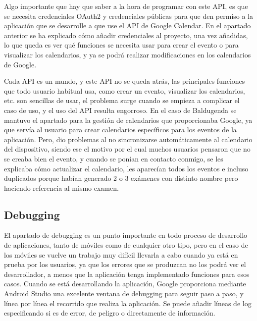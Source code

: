 Algo importante que hay que saber a la hora de programar con este API, es que se necesita credenciales OAuth2 y credenciales públicas para que den permiso a la aplicación que se desarrolle a que use el API de Google Calendar.
En el apartado anterior se ha explicado cómo añadir credenciales al proyecto, una vez añadidas, lo que queda es ver qué funciones se necesita usar para crear el evento o para visualizar los calendarios, y ya se podrá realizar modificaciones en los calendarios de Google.

Cada API es un mundo, y este API no se queda atrás, las principales funciones que todo usuario habitual usa, como crear un evento, visualizar los calendarios, etc. son sencillas de usar, el problema surge cuando se empieza a complicar el caso de uso, y el uso del API resulta engorroso.
En el caso de Baldugenda se mantuvo el apartado para la gestión de calendarios que proporcionaba Google, ya que servía al usuario para crear calendarios específicos para los eventos de la aplicación. Pero, dio problemas al no sincronizarse automáticamente al calendario del dispositivo, siendo ese el motivo por el cual muchos usuarios pensaron que no se creaba bien el evento, y cuando se ponían en contacto conmigo, se les explicaba cómo actualizar el calendario, les aparecían todos los eventos e incluso duplicados porque habían generado 2 o 3 exámenes con distinto nombre pero haciendo referencia al mismo examen.

\subsection{Debugging}
\label{subsecc:Debugging}

El apartado de debugging es un punto importante en todo proceso de desarrollo de aplicaciones, tanto de móviles como de cualquier otro tipo, pero en el caso de los móviles se vuelve un trabajo muy difícil llevarla a cabo cuando ya está en prueba por los usuarios, ya que los errores que se produzcan no los podrá ver el desarrollador, a menos que la aplicación tenga implementado funciones para esos casos.
Cuando se está desarrollando la aplicación, Google proporciona mediante Android Studio una excelente ventana de debugging para seguir paso a paso, y  línea por línea el recorrido que realiza la aplicación.
Se puede añadir líneas de log especificando si es de error, de peligro o directamente de información. 

